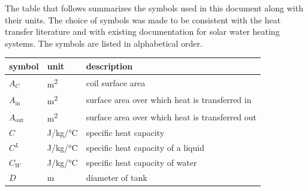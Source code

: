 \documentclass[12pt]{article}
\begin{document}
The table that follows summarizes the symbols used in this document along with
their units.  The choice of symbols was made to be consistent with the heat
transfer literature and with existing documentation for solar water heating
systems.  The symbols are listed in alphabetical order.

\renewcommand{\arraystretch}{1.2}
\noindent \begin{longtable*}{l l p{12cm}} \toprule
  \textbf{symbol} & \textbf{unit} & \textbf{description}\\
  \midrule 
  $A_C$ & \si[per-mode=symbol] {\square\metre} & coil surface area
  \\
  $A_\text{in}$ & \si[per-mode=symbol] {\square\metre} & surface area over 
  which heat is transferred in
  \\ 
  $A_\text{out}$ & \si[per-mode=symbol] {\square\metre} & surface area over 
  which heat is transferred out
  \\ 
  $C$ & \si[per-mode=symbol] {\joule\per \kilogram\per \celsius} &
  specific heat capacity
  \\
  $C^L$ & \si[per-mode=symbol] {\joule\per\kilo\gram\per\celsius} & specific 
  heat capacity of a liquid 
  \\ 
  $C_W$ & \si[per-mode=symbol] {\joule\per \kilogram\per \celsius} & specific
  heat capacity of water
  \\  
  $D$ & \si{\metre} & diameter of tank
  \\

\end{longtable*}
\end{document}
